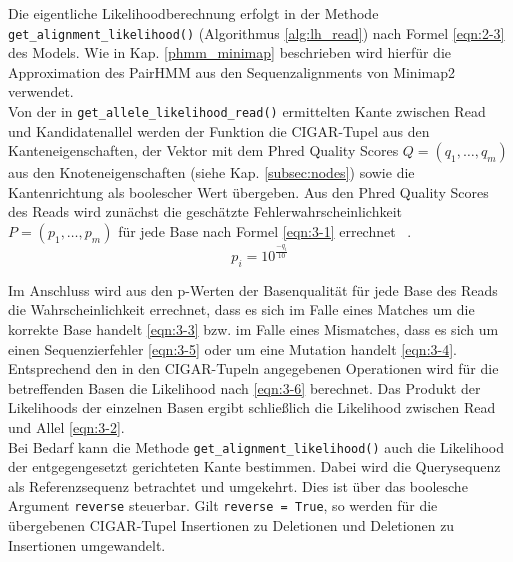 Die eigentliche Likelihoodberechnung erfolgt in der Methode \lstinline|get_alignment_likelihood()| (Algorithmus \ref{alg:lh_read}) nach Formel \eqref{eqn:2-3} des Models. Wie in Kap. \ref{phmm_minimap} beschrieben wird hierfür die Approximation des PairHMM aus den Sequenzalignments von Minimap2 verwendet.\\

Von der in \lstinline|get_allele_likelihood_read()| ermittelten Kante zwischen Read und Kandidatenallel werden der Funktion die CIGAR-Tupel aus den Kanteneigenschaften, der Vektor mit dem  Phred Quality Scores $Q =(q_{1}, \dots, q_{m})$ aus den Knoteneigenschaften (siehe Kap. \ref {subsec:nodes}) sowie die Kantenrichtung als boolescher Wert übergeben. Aus den Phred Quality Scores des Reads wird zunächst die geschätzte Fehlerwahrscheinlichkeit $ P=(p_{1}, \dots, p_{m}) $ für jede Base nach Formel \eqref{eqn:3-1} errechnet ~\cite{ewing_1998}.  
\begin{equation} \label{eqn:3-1}
\tag{3-1}
p_{i} = 10^{\frac{-q_{i}}{10}}
\end{equation}

Im Anschluss wird aus den p-Werten der Basenqualität für jede Base des Reads die Wahrscheinlichkeit errechnet, dass es sich im Falle eines Matches um die korrekte Base handelt \eqref{eqn:3-3} bzw. im Falle eines Mismatches, dass es sich um einen Sequenzierfehler \eqref{eqn:3-5} oder um eine Mutation handelt \eqref{eqn:3-4}. Entsprechend den in den CIGAR-Tupeln angegebenen Operationen wird für die betreffenden Basen die Likelihood nach \eqref{eqn:3-6} berechnet. Das Produkt der Likelihoods der einzelnen Basen ergibt schließlich die Likelihood zwischen Read und Allel \eqref{eqn:3-2}.\\

Bei Bedarf kann die Methode \lstinline|get_alignment_likelihood()| auch  die Likelihood der entgegengesetzt gerichteten Kante bestimmen. Dabei wird die Querysequenz als Referenzsequenz betrachtet und umgekehrt. Dies ist über das boolesche Argument \lstinline|reverse| steuerbar. Gilt \lstinline|reverse = True|, so werden für die übergebenen CIGAR-Tupel Insertionen zu Deletionen und Deletionen zu Insertionen umgewandelt.\\

